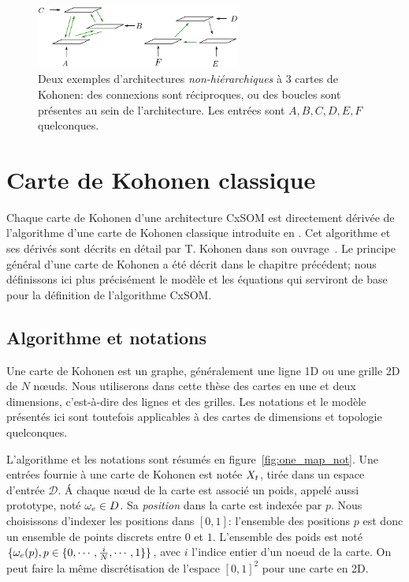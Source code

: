 \documentclass[../main]{subfiles}
\begin{document}
\begin{figure}
\centering
\includegraphics[width=0.6\textwidth]{architecture.pdf}
\caption{Deux exemples d'architectures \emph{non-hiérarchiques} à 3 cartes de Kohonen: des connexions sont réciproques, ou des boucles sont présentes au sein de l'architecture.
Les entrées sont $A,B,C,D,E,F$ quelconques.}
\label{fig:archi_non_hierarchique}
\end{figure}


\section{Carte de Kohonen classique}\label{sec:kohonen}
Chaque carte de Kohonen d'une architecture CxSOM est directement dérivée de l'algorithme d'une carte de Kohonen classique introduite en \cite{Kohonen1982}. Cet algorithme et ses dérivés sont décrits en détail par T. Kohonen dans son ouvrage~\cite{Kohonen1995SelfOrganizingM}. Le principe général d'une carte de Kohonen a été décrit dans le chapitre précédent; nous définissons ici plus précisément le modèle et les équations qui serviront de base pour la définition de l'algorithme CxSOM.

\subsection{Algorithme et notations}
Une carte de Kohonen est un graphe, généralement une ligne 1D ou une grille 2D de $N$ n\oe{}uds. Nous utiliserons dans cette thèse des cartes en une et deux dimensions, c'est-à-dire des lignes et des grilles. Les notations et le modèle présentés ici sont toutefois applicables à des cartes de dimensions et topologie quelconques.

L'algorithme et les notations sont résumés en figure~\ref{fig:one_map_not}. Une entrées fournie à une carte de Kohonen est notée $X_t$, tirée dans un espace d'entrée $\mathcal{D}$. \'A chaque n\oe{}ud de la carte est associé un poids, appelé aussi prototype, noté $\omega_e \in D$. Sa \emph{position} dans la carte est indexée par $p$. Nous choisissons d'indexer les positions dans $[0,1]$: l'ensemble des positions $p$ est donc un ensemble de points discrets entre $0$ et $1$. L'ensemble des poids est noté $\{\omega_e(p), p \in \{0,\cdots,\frac{i}{N}, \cdots, 1\}\}$, avec $i$ l'indice entier d'un noeud de la carte. On peut faire la même discrétisation de l'espace $[0,1]^2$ pour une carte en 2D.
\end{document}
